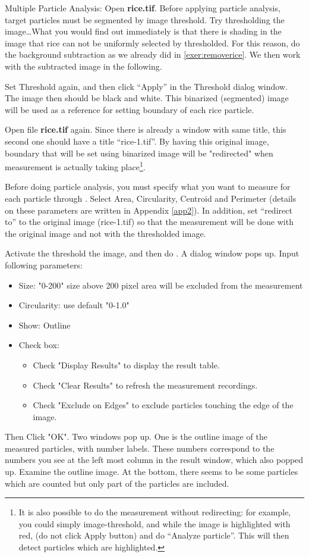 \begin{indentexercise}{2}
\item Multiple Particle Analysis: Open \textbf{rice.tif}. Before applying particle analysis, target
particles must be segmented by image threshold. Try thresholding the
image\ldots What you would find out immediately is that there is shading in
the image that rice can not be uniformly selected by thresholded. For this reason, do the
background subtraction as we already did in \ref{exer:removerice}. 
We then work with the subtracted image in the
following.

Set Threshold again, and then click ``Apply'' in the Threshold dialog window. 
The image then should be black and white. This binarized (segmented) image 
will be used as a reference for setting boundary of each rice particle. 

Open file \textbf{rice.tif} again. Since there is already a window with same title, this second one 
should have a title ``rice-1.tif''. By having this original image, boundary that will be set using binarized image 
will be "redirected" when measurement is actually taking place\footnote{ It is also possible to 
do the measurement without redirecting: for example, you could simply image-threshold, and while the image is highlighted with red, (do not click Apply button) and do ``Analyze particle''. This will then detect particles which are highlighted.}. 

Before doing particle analysis, you must specify what you want to
measure for each particle through . Select Area, Circularity, Centroid and Perimeter
(details on these parameters are written in Appendix \ref{app2}).
In addition, set ``redirect to'' to the original image (rice-1.tif) so
that the measurement will be done with the original image and not with 
the thresholded image. 

Activate the threshold the image, and then do . A dialog window pops up. Input following
parameters:
\begin{itemize}
\item Size: "0-200" size above 200 pixel area will be excluded from the measurement
\item Circularity: use default "0-1.0"
\item Show: Outline
\item Check box:
\begin{itemize} 
\item Check "Display Results" to display the result table.
\item Check "Clear Results" to refresh the measurement recordings.
\item Check "Exclude on Edges" to exclude particles touching the edge of the image. 
\end{itemize}
\end{itemize}
Then Click "OK". Two windows pop up. One
is the outline image of the measured particles, with number labels.
These numbers correspond to the numbers you see at the left most column
in the result window, which also popped up. Examine the outline image.
At the bottom, there seems to be some particles which are counted but
only part of the particles are included. 


\end{indentexercise}
